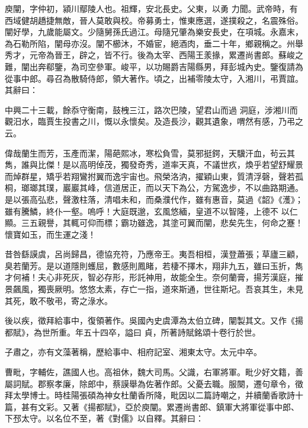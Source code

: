 \begin{pinyinscope}
 庾闡，字仲初，潁川鄢陵人也。祖輝，安北長史。父東，以勇
 力聞。武帝時，有西域健胡趫捷無敵，晉人莫敢與校。帝募勇士，惟東應選，遂撲殺之，名震殊俗。闡好學，九歲能屬文。少隨舅孫氏過江。母隨兄肇為樂安長史，在項城。永嘉末，為石勒所陷，闡母亦沒。闡不櫛沐，不婚宦，絕酒肉，垂二十年，鄉親稱之。州舉秀才，元帝為晉王，辟之，皆不行。後為太宰、西陽王羕掾，累遷尚書郎。蘇峻之難，闡出奔郗鑒，為司空參軍。峻平，以功賜爵吉陽縣男，拜彭城內史。鑒復請為從事中郎。尋召為散騎侍郎，領大著作。頃之，出補零陵太守，入湘川，弔賈誼。其辭曰：



 中興二十三載，餘忝守衡南，鼓栧三江，路次巴陵，望君山而過
 洞庭，涉湘川而觀汨水，臨賈生投書之川，慨以永懷矣。及造長沙，觀其遺象，喟然有感，乃弔之云。



 偉哉蘭生而芳，玉產而潔，陽葩熙冰，寒松負雪，莫邪挺鍔，天驥汗血，茍云其雋，誰與比傑！是以高明倬茂，獨發奇秀，道率天真，不議世疚，煥乎若望舒耀景而焯群星，矯乎若翔鸞拊翼而逸宇宙也。飛榮洛汭，擢穎山東，質清浮磬，聲若孤桐，瑯瑯其璞，巖巖其峰，信道居正，而以天下為公，方駕逸步，不以曲路期通。是以張高弘悲，聲激柱落，清唱未和，而桑濮代作，雖有惠音，莫過《韶》《濩》；雖有騰鱗，終仆一壑。嗚呼！大庭既邈，玄風悠緬，皇道不以智隆，上德不
 以仁顯。三五親譽，其輒可仰而標；霸功雖逸，其塗可翼而闡，悲矣先生，何命之蹇！懷寶如玉，而生運之淺！



 昔咎繇謨虞，呂尚歸昌，德協充符，乃應帝王。夷吾相桓，漢登蕭張；草廬三顧，臭若蘭芳。是以道隱則蠖屈，數感則鳳睹，若棲不擇木，翔非九五，雖曰玉折，雋才何補！夫心非死灰，智必存形，形託神用，故能全生。奈何蘭膏，揚芳漢庭，摧景飆風，獨喪厥明。悠悠太素，存亡一指，道來斯通，世往斯圮。吾哀其生，未見其死，敢不敬弔，寄之淥水。



 後以疾，徵拜給事中，復領著作。吳國內史虞潭為太伯立碑，闡製其文。又作《揚都賦》，為世所重。年五十四卒，謚曰
 貞，所著詩賦銘頌十卷行於世。



 子肅之，亦有文藻著稱，歷給事中、相府記室、湘東太守。太元中卒。



 曹毗，字輔佐，譙國人也。高祖休，魏大司馬。父識，右軍將軍。毗少好文籍，善屬詞賦。郡察孝廉，除郎中，蔡謨舉為佐著作郎。父憂去職。服闋，遷句章令，徵拜太學博士。時桂陽張碩為神女杜蘭香所降，毗因以二篇詩嘲之，并續蘭香歌詩十篇，甚有文彩。又著《揚都賦》，亞於庾闡。累遷尚書郎、鎮軍大將軍從事中郎、下邳太守。以名位不至，著《對儒》以自釋。其辭曰：




\end{pinyinscope}
